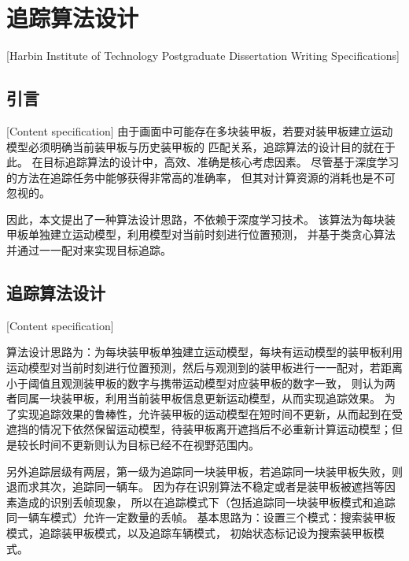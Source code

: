 

\chapter[追踪算法设计]{追踪算法设计}[Harbin Institute of Technology Postgraduate Dissertation Writing Specifications]

\section{引言}[Content specification]
由于画面中可能存在多块装甲板，若要对装甲板建立运动模型必须明确当前装甲板与历史装甲板的
匹配关系，追踪算法的设计目的就在于此。
在目标追踪算法的设计中，高效、准确是核心考虑因素。
尽管基于深度学习的方法在追踪任务中能够获得非常高的准确率，
但其对计算资源的消耗也是不可忽视的。
\par
因此，本文提出了一种算法设计思路，不依赖于深度学习技术。
该算法为每块装甲板单独建立运动模型，利用模型对当前时刻进行位置预测，
并基于类贪心算法
并通过一一配对来实现目标追踪。

\section{追踪算法设计}[Content specification]

算法设计思路为：为每块装甲板单独建立运动模型，每块有运动模型的装甲板利用运动模型对当前时刻进行位置预测，然后与观测到的装甲板进行一一配对，若距离小于阈值且观测装甲板的数字与携带运动模型对应装甲板的数字一致，
则认为两者同属一块装甲板，利用当前装甲板信息更新运动模型，从而实现追踪效果。
为了实现追踪效果的鲁棒性，允许装甲板的运动模型在短时间不更新，从而起到在受遮挡的情况下依然保留运动模型，待装甲板离开遮挡后不必重新计算运动模型；但是较长时间不更新则认为目标已经不在视野范围内。
\par

另外追踪层级有两层，第一级为追踪同一块装甲板，若追踪同一块装甲板失败，则退而求其次，追踪同一辆车。
因为存在识别算法不稳定或者是装甲板被遮挡等因素造成的识别丢帧现象，
所以在追踪模式下（包括追踪同一块装甲板模式和追踪同一辆车模式）允许一定数量的丢帧。
基本思路为：设置三个模式：搜索装甲板模式，追踪装甲板模式，以及追踪车辆模式，
初始状态标记设为搜索装甲板模式。

